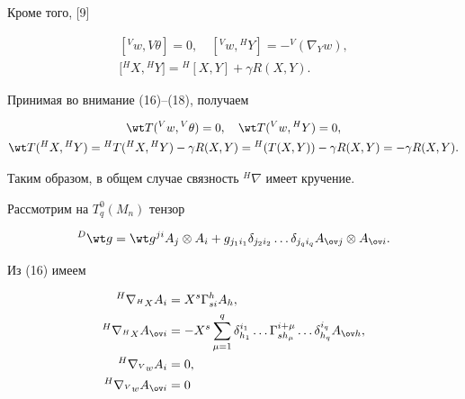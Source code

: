 Кроме того, [9]


\begin{equation}


\begin{array}{c}


[{}^Vw,{}V\theta]=0,\quad [{}^Vw,{}^HY]=-{}^V(\nabla_Y w),\\[2mm]


\lbrack{}^HX,{}^HY]={}^H[X,Y]+\gamma R(X,Y).


\end{array}


\end{equation}


Принимая во внимание (16)--(18), получаем


\begin{gather*}


\wt T({}^Vw,{}^V\theta)=0,\quad


\wt T({}^Vw,{}^HY)=0,\\


\wt T({}^HX,{}^HY)={}^HT({}^HX,{}^HY)


-\gamma R(X,Y)={}^H(T(X,Y))-\gamma R(X,Y)=-\gamma R(X,Y).


\end{gather*}





Таким образом, в общем случае связность ${}^H\nabla$ имеет кручение.





Рассмотрим на $T^0_q(M_n)$ тензор


\begin{equation}


{}^D\wt g=\wt g{}^{ji}A_j\otimes A_i+g_{j_1i_1}


\delta_{j_2i_2}\dotsc \delta_{j_q i_q}


A_{{\ov j}}\otimes A_{{\ov i}}.


\end{equation}





Из (16) имеем


\begin{equation}


\begin{split}


{}^H\nabla_{{}^HX}A_i&=X^s\Gamma^h_{si}A_h, \\


{}^H\nabla_{{}^HX}A_{{\ov i}}&=-X^s\sum\limits^q_{\mu=1}


\delta^{i_1}_{h_1}\dotsc \Gamma^{i+\mu}_{sh_\mu}


\dotsc \delta^{i_q}_{h_q}A_{\ov h}, \\


{}^H\nabla_{{}^Vw}A_i&=0,\\


{}^H\nabla_{{}^Vw}A_{{\ov i}}&=0


\end{split}


\end{equation}


